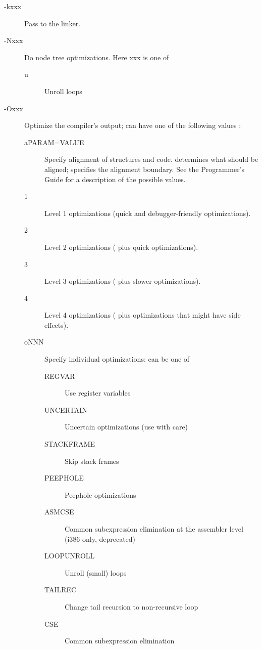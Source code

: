 \begin{description}
\item[-kxxx] Pass  to the linker.  
\item[-Nxxx] Do node tree optimizations. Here xxx is one of
\begin{description}
\item[u] Unroll loops   
\end{description}
\item[-Oxxx]  Optimize the compiler's output;  can have one
of the following values :
\begin{description}
\item[aPARAM=VALUE] Specify alignment of structures and code. 
determines what should be aligned;  specifies the alignment
boundary. See the Programmer's Guide for a description of the possible
values.
\item[1] Level 1 optimizations (quick and debugger-friendly optimizations).
\item[2] Level 2 optimizations ( plus quick optimizations).
\item[3] Level 3 optimizations ( plus slower optimizations).
\item[4] Level 4 optimizations ( plus optimizations that might have side effects).
\item[oNNN] Specify individual optimizations:  can be one of
\begin{description}
\item[REGVAR] Use register variables
\item[UNCERTAIN] Uncertain optimizations (use with care)
\item[STACKFRAME] Skip stack frames
\item[PEEPHOLE] Peephole optimizations
\item[ASMCSE] Common subexpression elimination at the assembler level (i386-only, deprecated)
\item[LOOPUNROLL] Unroll (small) loops
\item[TAILREC] Change tail recursion to non-recursive loop
\item[CSE] Common subexpression elimination

\end{description}
\end{description}
\end{description}
